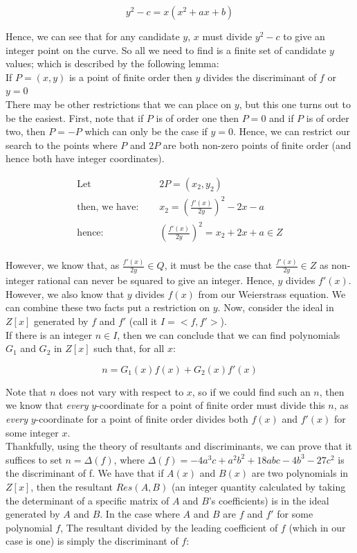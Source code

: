 \documentclass{article}
\begin{document}
\[ y^2 - c = x(x^2 + a x + b) \]

Hence, we can see that for any candidate $y$, $x$ must divide $y^2 - c$ to give an integer point on the curve. So all we need to find is a finite set of candidate $y$ values; which is described by the following lemma:\\

If $P = (x, y)$ is a point of finite order then $y$ divides the discriminant of $f$ or $y = 0$\\

There may be other restrictions that we can place on $y$, but this one turns out to be the easiest. First, note that if $P$ is of order one then $P = 0$ and if $P$ is of order two, then $P = -P$ which can only be the case if $y = 0$. Hence, we can restrict our search to the points where $P$ and $2P$ are both non-zero points of finite order (and hence both have integer coordinates).

\begin{align*}
    \text{Let } \quad & 2P = (x_2, y_2)\\
    \text{then, we have: } \quad & x_2 = \left( \frac{f'(x)}{2y} \right) ^2 - 2x - a\\
    \text{hence: } \quad & \left( \frac{f'(x)}{2y} \right) ^2 = x_2 + 2x + a \in Z\\
\end{align*}

However, we know that, as $\frac{f'(x)}{2y} \in Q$, it must be the case that $\frac{f'(x)}{2y} \in Z$ as non-integer rational can never be squared to give an integer. Hence, $y$ divides $f'(x)$. However, we also know that $y$ divides $f(x)$ from our Weierstrass equation. We can combine these two facts put a restriction on $y$. Now, consider the ideal in $Z[x]$ generated by $f$ and $f'$ (call it $I = <f, f'>$).\\

If there is an integer $n \in I$, then we can conclude that we can find polynomials $G_1$ and $G_2$ in $Z[x]$ such that, for all $x$:

\[ n = G_1(x)f(x) + G_2(x)f'(x) \]

Note that $n$ does not vary with respect to $x$, so if we could find such an $n$, then we know that \emph{every} $y$-coordinate for a point of finite order must divide this $n$, as \emph{every} $y$-coordinate for a point of finite order divides both $f(x)$ and $f'(x)$ for some integer $x$.\\

Thankfully, using the theory of resultants and discriminants, we can prove that it suffices to set $n = \Delta(f)$, where $\Delta(f) = -4a^3c + a^2b^2 + 18abc - 4b^3 - 27c^2$ is the discriminant of f. We have that if $A(x)$ and $B(x)$ are two polynomials in $Z[x]$, then the resultant $Res(A, B)$ (an integer quantity calculated by taking the determinant of a specific matrix of $A$ and $B$'s coefficients) is in the ideal generated by $A$ and $B$. In the case where $A$ and $B$ are $f$ and $f'$ for some polynomial $f$, The resultant divided by the leading coefficient of $f$ (which in our case is one) is simply the discriminant of $f$: \\
\end{document}
